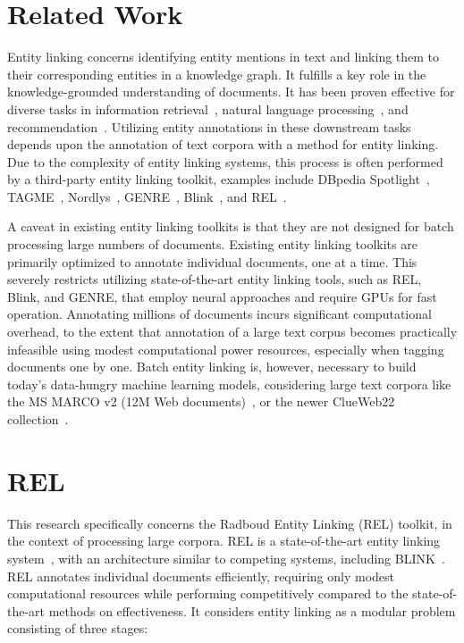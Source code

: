 \section{Related Work}
Entity linking concerns identifying entity mentions in text and linking them to their corresponding entities in a knowledge graph. It fulfills a key role in the knowledge-grounded understanding of documents. It has been proven effective for diverse tasks in information retrieval~\citep{Gerritse:2022:EMBERT, Gerritse:2020:GEER, doc-ranking-entity, el-ranking-hasibi, el-balog, query-recommendation-entity, chatterjee2022bert}, natural language processing~\citep{lin-etal-2012-entity, watson}, and recommendation~\citep{yang-etal-2018-collective}.
Utilizing entity annotations in these downstream tasks depends upon the annotation of text corpora with a method for entity linking. Due to the complexity of entity linking systems, this process is often performed by a third-party entity linking toolkit, examples include DBpedia Spotlight~\citep{dbpedia-spotlight}, TAGME~\citep{tagme}, Nordlys~\citep{nordlys}, GENRE~\citep{genre}, Blink~\citep{blink}, and REL~\citep{rel}.

A caveat in existing entity linking toolkits is that they are not designed for batch processing large numbers of documents. Existing entity linking toolkits are primarily optimized to annotate individual documents, one at a time. This severely restricts utilizing state-of-the-art entity linking tools, such as REL, Blink, and GENRE, that employ neural approaches and require GPUs for fast operation. Annotating millions of documents incurs significant computational overhead, to the extent that annotation of a large text corpus becomes practically infeasible using modest computational power resources, especially when tagging documents one by one. Batch entity linking is, however, necessary to build today's data-hungry machine learning models, considering large text corpora like the MS MARCO v2 (12M Web documents)~\citep{msmarco}, or the newer ClueWeb22 collection~\citep{clueweb22}.

\section{REL}
This research specifically concerns the Radboud Entity Linking (REL) toolkit, in the context of processing large corpora. REL is a state-of-the-art entity linking system~\citep{bast-etal-2023-fair}, with an architecture similar to competing systems, including BLINK~\citep{blink}.
REL annotates individual documents efficiently, requiring only modest computational resources while performing competitively compared to the state-of-the-art methods on effectiveness. It considers entity linking as a modular problem consisting of three stages:


